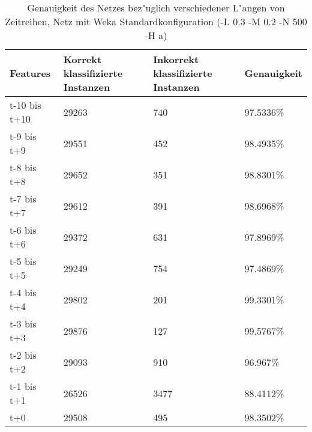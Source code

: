 \begin{table}[p]
\begin{tabular}{l|p{4cm}|p{4cm}|l}
Features & Korrekt klassifizierte Instanzen & Inkorrekt klassifizierte Instanzen & Genauigkeit  \\
\hline
t-10 bis t+10 & 29263 & 740 & 97.5336\% \\
t-9 bis t+9 & 29551 & 452 & 98.4935\% \\
t-8 bis t+8 & 29652 & 351 & 98.8301\% \\
t-7 bis t+7 & 29612 & 391 & 98.6968\% \\
t-6 bis t+6 & 29372 & 631 & 97.8969\% \\
t-5 bis t+5 & 29249 & 754 & 97.4869\% \\
t-4 bis t+4 & 29802 & 201 & 99.3301\% \\
t-3 bis t+3 & 29876 & 127 & 99.5767\% \\
t-2 bis t+2 & 29093 & 910 & 96.967\% \\
t-1 bis t+1 & 26526 & 3477 & 88.4112\% \\
t+0 & 29508 & 495 & 98.3502\% 
\end{tabular}
\caption[Genauigkeit der Zeitreihen Features]{Genauigkeit des Netzes bez"uglich verschiedener L"angen von Zeitreihen, Netz mit Weka Standardkonfiguration (-L 0.3 -M 0.2 -N 500 -H a)}
\label{EvalZeit}
\end{table}

